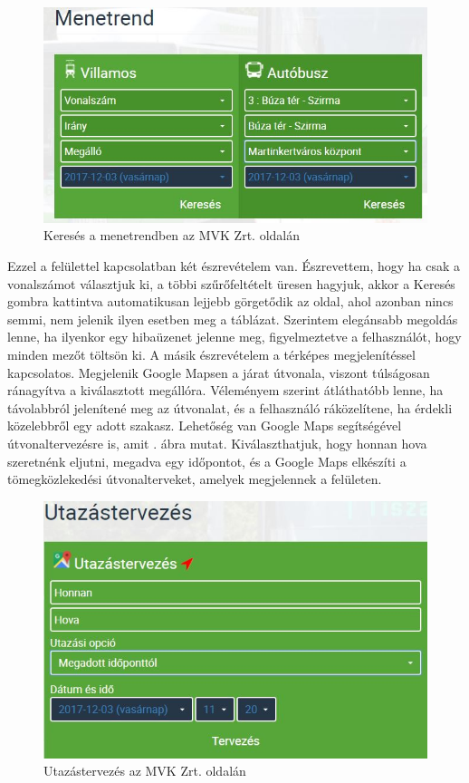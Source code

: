\begin{figure}[h!]
\centering
\includegraphics[scale=0.7]{kepek/MVK_menetrend.jpg}
\caption{Keresés a menetrendben az MVK Zrt. oldalán}
\label{fig:MVK_menetrend}
\end{figure}

Ezzel a felülettel kapcsolatban két észrevételem van. Észrevettem, hogy ha csak a vonalszámot választjuk ki, a többi szűrőfeltételt üresen hagyjuk, akkor a Keresés gombra kattintva automatikusan lejjebb görgetődik az oldal, ahol azonban nincs semmi, nem jelenik ilyen esetben meg a táblázat. Szerintem elegánsabb megoldás lenne, ha ilyenkor egy hibaüzenet jelenne meg, figyelmeztetve a felhasználót, hogy minden mezőt töltsön ki. A másik észrevételem a térképes megjelenítéssel kapcsolatos. Megjelenik Google Mapsen a járat útvonala, viszont túlságosan ránagyítva a kiválasztott megállóra. Véleményem szerint átláthatóbb lenne, ha távolabbról jelenítené meg az útvonalat, és a felhasználó ráközelítene, ha érdekli közelebbről egy adott szakasz. Lehetőség van Google Maps segítségével útvonaltervezésre is, amit . ábra mutat. Kiválaszthatjuk, hogy honnan hova szeretnénk eljutni, megadva egy időpontot, és a Google Maps elkészíti a tömegközlekedési útvonalterveket, amelyek megjelennek a felületen.

\begin{figure}[h!]
\centering
\includegraphics[scale=0.7]{kepek/MVK_utazastervezes.jpg}
\caption{Utazástervezés az MVK Zrt. oldalán}
\label{fig:MVK_utazastervezes}
\end{figure}

